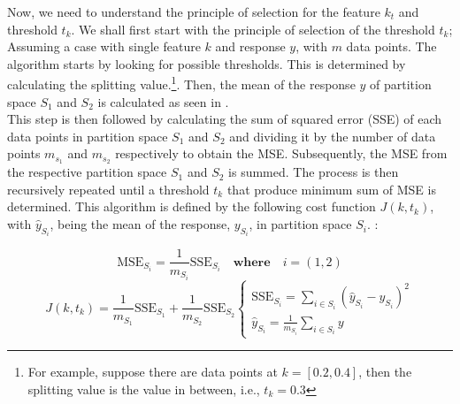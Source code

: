 Now, we need to understand the principle of selection for the feature $k_t$ and threshold $t_k$. We shall first start with the principle of selection of the threshold $t_k$; Assuming a case with single feature $k$ and response $y$, with $m$ data points. The algorithm starts by looking for possible thresholds. This is determined by calculating the splitting value.\footnote{For example, suppose there are data points at $k = [0.2,0.4]$, then the splitting value is the value in between, i.e., $t_k = 0.3$}. Then, the mean of the response $y$ of partition space $S_1$ and $S_2$ is calculated as seen in .\\ 

This step is then followed by calculating the sum of squared error (SSE) of each data points in partition space $S_1$ and $S_2$ and dividing it by the number of data points $m_{s_1}$ and $m_{s_2}$ respectively to obtain the MSE. Subsequently, the MSE from the respective partition space $S_1$ and $S_2$ is summed. The process is then recursively repeated until a threshold $t_k$ that produce minimum sum of MSE is determined. This algorithm is defined by the following cost function $J(k,t_k)$, with $\hat{y}_{S_i}$, being the mean of the response, $y_{S_i}$, in partition space $S_i$. \cite{Geron.2019,Kuhn.2013}:

\begin{equation}\label{eqn:sse}
    \text{MSE}_{S_i} = \frac{1}{m_{S_i}}\text{SSE}_{S_i} \quad \textbf{where} \quad i = (1,2)   
\end{equation}
\begin{equation}\label{eqn:costfun}
    J(k,t_k) = \frac{1}{m_{S_1}}\text{SSE}_{S_1} + \frac{1}{m_{S_2}}\text{SSE}_{S_2}
    \begin{cases}
        \text{SSE}_{S_i} = \sum\limits_{i \in S_i}(\hat{y}_{S_i} - y_{S_i} )^2 \\
        \hat{y}_{S_i} = \frac{1}{m_{S_i}}\sum\limits_{i\in S_i} y
    \end{cases}  
\end{equation}


